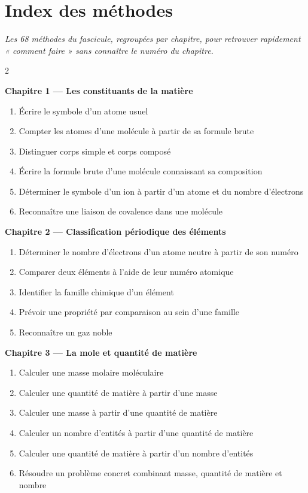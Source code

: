 \chapter{Index des méthodes}

\noindent\textit{Les 68 méthodes du fascicule, regroupées par chapitre, pour retrouver
rapidement « comment faire » sans connaître le numéro du chapitre.}
\vspace{8pt}

\begin{multicols}{2}
\footnotesize

\textbf{\normalsize\color{onbo}Chapitre 1 --- Les constituants de la matière}
\begin{enumerate}[label=\arabic*.,itemsep=1pt,topsep=2pt,leftmargin=1.6em]
\item Écrire le symbole d'un atome usuel
\item Compter les atomes d'une molécule à partir de sa formule brute
\item Distinguer corps simple et corps composé
\item Écrire la formule brute d'une molécule connaissant sa composition
\item Déterminer le symbole d'un ion à partir d'un atome et du nombre d'électrons
\item Reconnaître une liaison de covalence dans une molécule
\end{enumerate}
\vspace{4pt}

\textbf{\normalsize\color{onbo}Chapitre 2 --- Classification périodique des éléments}
\begin{enumerate}[label=\arabic*.,itemsep=1pt,topsep=2pt,leftmargin=1.6em]
\item Déterminer le nombre d'électrons d'un atome neutre à partir de son numéro
\item Comparer deux éléments à l'aide de leur numéro atomique
\item Identifier la famille chimique d'un élément
\item Prévoir une propriété par comparaison au sein d'une famille
\item Reconnaître un gaz noble
\end{enumerate}
\vspace{4pt}

\textbf{\normalsize\color{onbo}Chapitre 3 --- La mole et quantité de matière}
\begin{enumerate}[label=\arabic*.,itemsep=1pt,topsep=2pt,leftmargin=1.6em]
\item Calculer une masse molaire moléculaire
\item Calculer une quantité de matière à partir d'une masse
\item Calculer une masse à partir d'une quantité de matière
\item Calculer un nombre d'entités à partir d'une quantité de matière
\item Calculer une quantité de matière à partir d'un nombre d'entités
\item Résoudre un problème concret combinant masse, quantité de matière et nombre
\end{enumerate}
\vspace{4pt}


\end{multicols}
